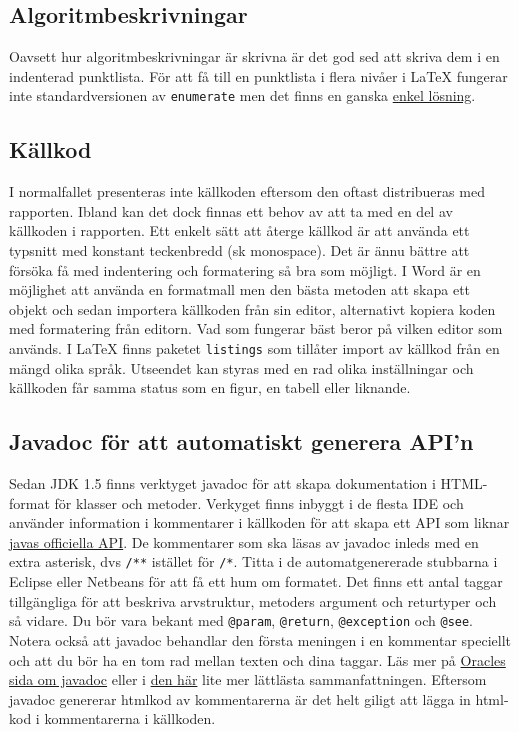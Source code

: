 \documentclass[11pt,a4paper]{article}
\begin{document}
    \subsection{Algoritmbeskrivningar}
    Oavsett hur algoritmbeskrivningar är skrivna är det god sed att skriva dem i en indenterad punktlista. För att få till en punktlista i flera nivåer i \LaTeX{} fungerar inte standardversionen av \verb|enumerate| men det finns en ganska \href{https://vantr.wordpress.com/2011/12/16/multi-level-enumerated-list-in-latex/}{enkel lösning}.

    \subsection{Källkod}
    I normalfallet presenteras inte källkoden eftersom den oftast distribueras med rapporten. Ibland kan det dock finnas ett behov av att ta med en del av källkoden i rapporten. Ett enkelt sätt att återge källkod är att använda ett typsnitt med konstant teckenbredd (sk monospace). Det är ännu bättre att försöka få med indentering och formatering så bra som möjligt. I Word är en möjlighet att använda en formatmall men den bästa metoden att skapa ett objekt och sedan importera källkoden från sin editor, alternativt kopiera koden med formatering från editorn. Vad som fungerar bäst beror på vilken editor som används. I \LaTeX{} finns paketet \verb|listings| som tillåter import av källkod från en mängd olika språk. Utseendet kan styras med en rad olika inställningar och källkoden får samma status som en figur, en tabell eller liknande.
    \subsection{Javadoc för att automatiskt generera API'n}
    Sedan JDK 1.5 finns verktyget javadoc för att skapa dokumentation i HTML-format för klasser och metoder. Verkyget finns inbyggt i de flesta IDE och använder information i kommentarer i källkoden för att skapa ett API som liknar \href{http://docs.oracle.com/javase/7/docs/api/}{javas officiella API}. De kommentarer som ska läsas av javadoc inleds med en extra asterisk, dvs \verb|/**| istället för \verb|/*|. Titta i de automatgenererade stubbarna i Eclipse eller Netbeans för att få ett hum om formatet. Det finns ett antal taggar tillgängliga för att beskriva arvstruktur, metoders argument och returtyper och så vidare. Du bör vara bekant med \verb|@param|, \verb|@return|, \verb|@exception| och \verb|@see|. Notera också att javadoc behandlar den första meningen i en kommentar speciellt och att du bör ha en tom rad mellan texten och dina taggar. Läs mer på \href{http://www.oracle.com/technetwork/articles/java/index-137868.html}{Oracles sida om javadoc} eller i \href{https://supportweb.cs.bham.ac.uk/docs/tutorials/docsystem/build/tutorials/javadoc/javadoc.pdf}{den här} lite mer lättlästa sammanfattningen. Eftersom javadoc genererar htmlkod av kommentarerna är det helt giligt att lägga in html-kod i kommentarerna i källkoden.
\end{document}
